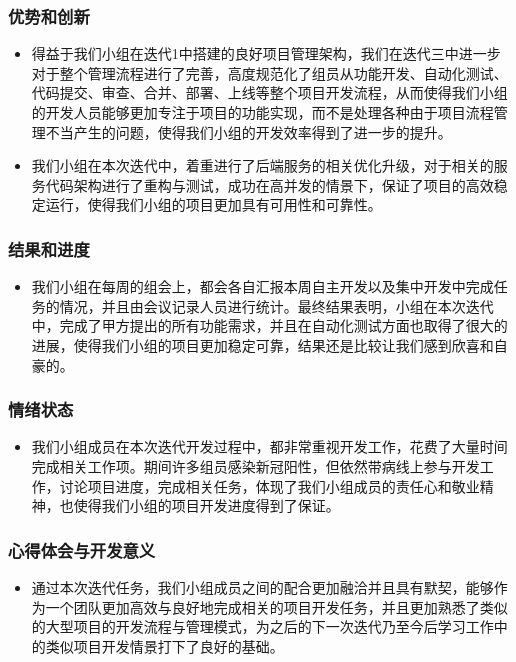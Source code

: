 \begin{frame}
    \frametitle{优势和创新}
    \begin{itemize}
        \item 得益于我们小组在迭代1中搭建的良好项目管理架构，我们在迭代三中进一步对于整个管理流程进行了完善，高度规范化了组员从功能开发、自动化测试、代码提交、审查、合并、部署、上线等整个项目开发流程，从而使得我们小组的开发人员能够更加专注于项目的功能实现，而不是处理各种由于项目流程管理不当产生的问题，使得我们小组的开发效率得到了进一步的提升。
        \item 我们小组在本次迭代中，着重进行了后端服务的相关优化升级，对于相关的服务代码架构进行了重构与测试，成功在高并发的情景下，保证了项目的高效稳定运行，使得我们小组的项目更加具有可用性和可靠性。
    \end{itemize}
\end{frame}

\begin{frame}
    \frametitle{结果和进度}
    \begin{itemize}
        \item 我们小组在每周的组会上，都会各自汇报本周自主开发以及集中开发中完成任务的情况，并且由会议记录人员进行统计。最终结果表明，小组在本次迭代中，完成了甲方提出的所有功能需求，并且在自动化测试方面也取得了很大的进展，使得我们小组的项目更加稳定可靠，结果还是比较让我们感到欣喜和自豪的。
    \end{itemize}
\end{frame}

\begin{frame}
    \frametitle{情绪状态}
    \begin{itemize}
        \item 我们小组成员在本次迭代开发过程中，都非常重视开发工作，花费了大量时间完成相关工作项。期间许多组员感染新冠阳性，但依然带病线上参与开发工作，讨论项目进度，完成相关任务，体现了我们小组成员的责任心和敬业精神，也使得我们小组的项目开发进度得到了保证。
    \end{itemize}
\end{frame}

\begin{frame}
    \frametitle{心得体会与开发意义}
    \begin{itemize}
        \item 通过本次迭代任务，我们小组成员之间的配合更加融洽并且具有默契，能够作为一个团队更加高效与良好地完成相关的项目开发任务，并且更加熟悉了类似的大型项目的开发流程与管理模式，为之后的下一次迭代乃至今后学习工作中的类似项目开发情景打下了良好的基础。
    \end{itemize}
\end{frame}